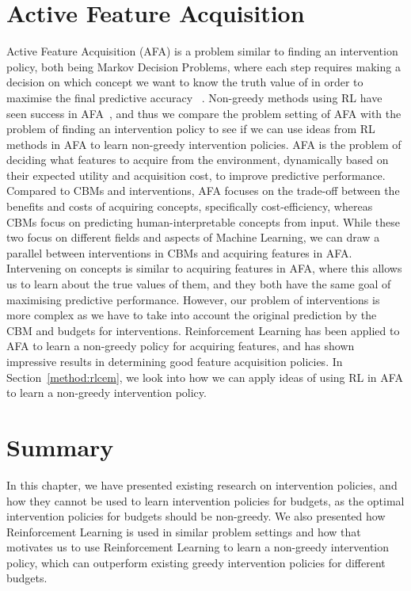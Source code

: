 \section{Active Feature Acquisition}\label{background:afa}
Active Feature Acquisition (AFA) 
is a problem similar to finding an intervention
policy, both being Markov Decision Problems,
where each step requires making a decision
on which concept we want to know the truth value of in order to maximise the final predictive accuracy
~\cite{afa}. Non-greedy methods using 
RL have seen success in
AFA~\cite{gsmrl, non-greedy-1}, and thus we compare the problem
setting of AFA with the problem 
of finding an intervention policy
to see if we can use ideas from RL 
methods in AFA to learn
non-greedy intervention policies.
AFA is the problem of deciding
what features to acquire from the environment, dynamically based
on their expected utility and acquisition cost, to 
improve predictive performance. Compared to
CBMs and interventions, AFA focuses on 
the trade-off between the benefits and costs of acquiring concepts,
specifically cost-efficiency, whereas
CBMs focus on predicting human-interpretable concepts 
from input. While these two focus on different fields and aspects
of Machine Learning, we can draw a parallel between
interventions in CBMs and acquiring features in AFA.
Intervening on concepts is similar to acquiring features in AFA,
where this allows us to learn about the true values of them,
and they both have the same goal of maximising predictive performance.
However, our problem of interventions is more complex as we have to take
into account the original prediction by the CBM and budgets for interventions.
Reinforcement Learning has been applied to AFA to learn a non-greedy
policy for acquiring features, and has shown impressive results
in determining good feature acquisition policies.
In Section~\ref{method:rlcem}, we look into how we can apply ideas of using
RL in AFA to learn a non-greedy intervention policy.

\section{Summary}
In this chapter, 
we have presented existing research on intervention policies, and how they cannot be used
to learn intervention policies for budgets,
as the optimal intervention policies for budgets should be non-greedy. We also presented how Reinforcement Learning is used in similar problem settings and how that motivates us to use Reinforcement Learning
to learn a non-greedy intervention policy,
which can outperform existing greedy intervention policies for different budgets.

